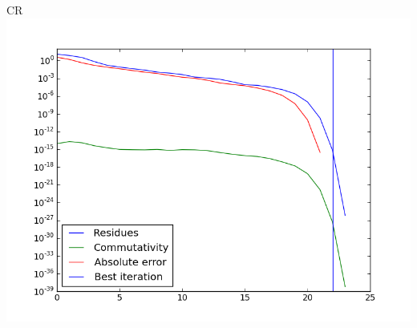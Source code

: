 \documentclass{beamer}
\theoremstyle{plain}
\theoremstyle{definition}
\theoremstyle{remark}
\begin{document}
\begin{frame}{CR}
  \includegraphics[width=\textwidth,height=\textheight]{"chebvand/CR - absplot"}
\end{frame}
\end{document}
